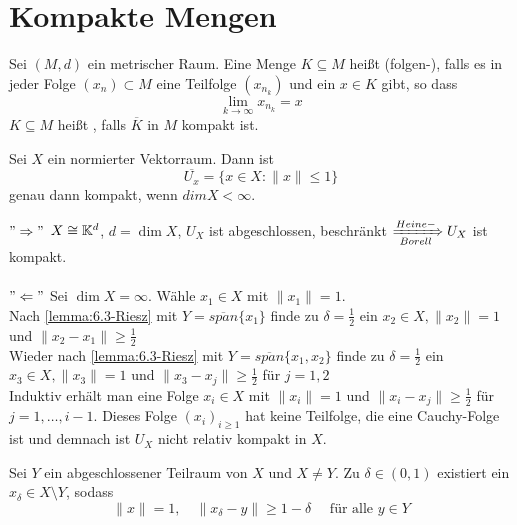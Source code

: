 


\section{Kompakte Mengen}



\begin{definition}  
	Sei $(M, d)$ ein metrischer Raum. Eine Menge $K \subseteq M$ hei{\ss}t (folgen-), falls es in jeder Folge $(x_{n}) \subset M$ eine Teilfolge $(x_{n_{k}})$ und ein $x \in K$ gibt, so dass 
		\[ \lim_{k \rightarrow \infty} x_{n_{k}} = x \]
		$K \subseteq M$ hei{\ss}t , falls $\overline{K}$ in $M$ kompakt ist.
\end{definition}


\begin{satz} \label{satz-6.2}
	Sei $X$ ein normierter Vektorraum. Dann ist
	\[ \overline{U_{x}} = \{ x \in X: \| x \| \leq 1 \} \]
	genau dann kompakt, wenn $dim X < \infty$.
\end{satz}
 
\begin{beweis}
	$"\Rightarrow"$ $X \cong \mathbb{K}^{d}$, $d = \dim X$, $U_X$ ist abgeschlossen, beschränkt $\xRightarrow[Borell]{Heine-} U_{X}$ ist kompakt. \\ \\
	$"\Leftarrow"$ Sei $\dim X = \infty$. Wähle $x_1 \in X$ mit $\| x_1 \| = 1$. \\
	Nach \eqref{lemma:6.3-Riesz} mit $ Y = \overline{span}\{ x_{1} \}$ finde zu $\delta = \frac{1}{2}$ ein $x_{2} \in X, \| x_{2} \| = 1$ und $\| x_{2} - x_{1} \| \geq \frac{1}{2}$ \\
	Wieder nach \eqref{lemma:6.3-Riesz} mit $ Y = \overline{span}\{ x_{1}, x_{2} \}$ finde zu $\delta = \frac{1}{2}$ ein $x_{3} \in X, \| x_{3} \| = 1$ und $\| x_{3} - x_{j} \| \geq \frac{1}{2}$ für $j = 1, 2$ \\
	Induktiv erhält man eine Folge $x_{i} \in X$ mit $\| x_{i} \| = 1$ und $\| x_{i} - x_{j} \| \geq \frac{1}{2}$ für $j = 1, \dotsc, i - 1$.
	Dieses Folge $(x_{i})_{i \geq 1}$ hat keine Teilfolge, die eine Cauchy-Folge ist und demnach ist $U_{X}$ nicht relativ kompakt in $X$. 
\end{beweis}


\begin{lemma}[Riesz] \label{lemma:6.3-Riesz} 
	Sei $Y$ ein abgeschlossener Teilraum von $X$ und $X \neq Y$. Zu $\delta \in (0, 1)$ existiert ein $x_{\delta} \in X \setminus Y$, sodass
	\[ \| x \| = 1, \quad \| x_{\delta} - y\| \geq 1 - \delta \quad \text{ für alle } y \in Y \]
\end{lemma}

